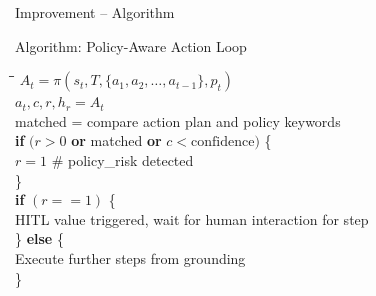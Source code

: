 \begin{frame}{Improvement -- Algorithm}
  \begin{block}{Algorithm: Policy-Aware Action Loop}
    \ttfamily\small
    \begin{tabbing}
      \hspace{0.5cm}\=\hspace{0.5cm}\=\hspace{0.5cm}\=\kill
      $A_t = \pi(s_t, T, \{a_1, a_2, \ldots, a_{t-1}\}, p_t)$ \\[2pt]
      $a_t, c, r, h_r = A_t$ \\[2pt]
      matched = compare action plan and policy keywords \\[4pt]
      \textbf{if} $(r > 0$ \textbf{or} matched \textbf{or} $c < \text{confidence})$ \{ \\
      \> $r = 1$ \hspace{1cm} \# policy\_risk detected \\
      \} \\[4pt]
      \textbf{if} $(r == 1)$ \{ \\
      \> HITL value triggered, wait for human interaction for step \\
      \} \textbf{else} \{ \\
      \> Execute further steps from grounding \\
      \}
    \end{tabbing}
  \end{block}
\end{frame}
